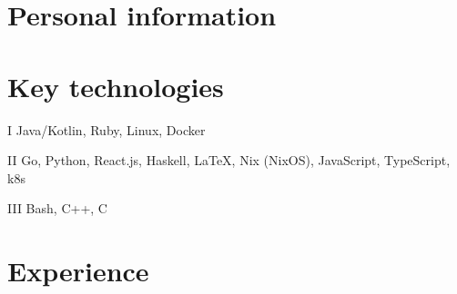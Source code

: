 \documentclass{cv}
\begin{document}

\section{Personal information}






\section{Key technologies}

\begin{cvblock}{I}
  Java/Kotlin, Ruby, Linux, Docker
\end{cvblock}

\begin{cvblock}{II}
  Go, Python, React.js, Haskell, \LaTeX, Nix (NixOS), JavaScript, TypeScript, k8s
\end{cvblock}

\begin{cvblock}{III}
  Bash, C++, C
\end{cvblock}


\section{Experience}
\end{document}
